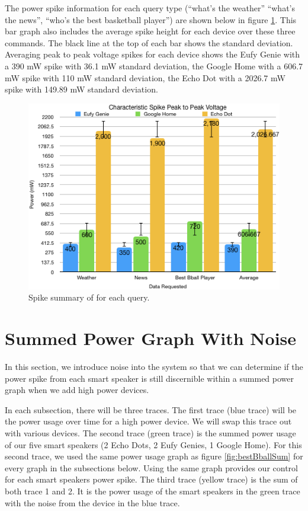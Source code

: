 The power spike information for each query type (``what's the weather'' ``what's the news'', ``who's the best basketball player'') are shown below in figure \ref{fig:spikeVoltages}. This bar graph also includes the average spike height for each device over these three commands. The black line at the top of each bar shows the standard deviation. Averaging peak to peak voltage spikes for each device shows the Eufy Genie with a 390 mW spike with 36.1 mW standard deviation, the Google Home with a 606.7 mW spike with 110 mW standard deviation, the Echo Dot with a 2026.7 mW spike with 149.89 mW standard deviation.

\begin{figure}[H]
  \centering
  \includegraphics[width=1\textwidth]{figures/spikeVoltages.png}
  \caption{Spike summary of for each query.}
  \label{fig:spikeVoltages}
\end{figure}

\section{Summed Power Graph With Noise}
\label{sumPowerGraphSection}
In this section, we introduce noise into the system so that we can determine if the power spike from each smart speaker is still discernible within a summed power graph when we add high power devices.

In each subsection, there will be three traces. The first trace (blue trace) will be the power usage over time for a high power device. We will swap this trace out with various devices. The second trace (green trace) is the summed power usage of our five smart speakers (2 Echo Dots, 2 Eufy Genies, 1 Google Home). For this second trace, we used the same power usage graph as figure \ref{fig:bestBballSum} for every graph in the subsections below. Using the same graph provides our control for each smart speakers power spike. The third trace (yellow trace) is the sum of both trace 1 and 2. It is the power usage of the smart speakers in the green trace with the noise from the device in the blue trace.

